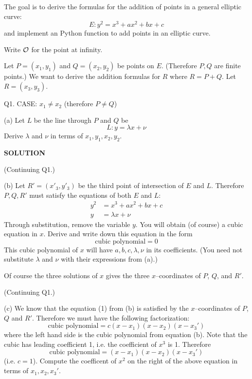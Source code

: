 \documentclass[a4paper,12pt]{article}
\begin{document}
\topmatter


The goal is to derive the formulas for the addition of points in 
a general elliptic curve:
\[
E: y^2 = x^3 + ax^2 + bx + c
\]
and implement an Python function to add points in an elliptic curve.

Write ${\cal O}$ for the point at infinity.

\newpage

Let $P = (x_1, y_1)$ and $Q = (x_2, y_2)$ be points on $E$.
(Therefore $P, Q$ are finite points.)
We want to derive the addition formulas for $R$ where $R = P + Q$.
Let $R = (x_3, y_3)$.

Q1. CASE: $x_1 \neq x_2$ (therefore $P \neq Q$)

(a) Let $L$ be the line through $P$ and $Q$ be
\[
L: y = \lambda x + \nu 
\] 
Derive $\lambda$ and $\nu$ in terms of $x_1, y_1, x_2, y_2$.

{\bf SOLUTION}




\newpage


(Continuing Q1.)

(b) Let $R' = (x'_3, y'_3)$ be the third point of intersection of $E$ and $L$.
Therefore $P, Q, R'$ must satisfy the equations of both $E$ and $L$:
\begin{align*}
y^2 &= x^3 + ax^2 + bx + c \\
y   &= \lambda x + \nu
\end{align*}
Through substitution, remove the variable $y$. 
You will obtain (of course) a cubic equation in $x$.
Derive and write down this equation in the form
\[
\text{cubic polynomial} = 0 
\]
This cubic polynomial of $x$ will have $a,b,c,\lambda, \nu$ 
in its coefficients.
(You need not substitute $\lambda$ and $\nu$ with their
expressions from (a).)

Of course the three solutions of $x$ gives the three $x$--coordinates
of $P$, $Q$, and $R'$.

\SOLUTION



\newpage

(Continuing Q1.)

(c) We know that the equation (1) from (b) is satisfied by 
the $x$--coordinates of $P$, $Q$ and $R'$.
Therefore we must have the following factorization:
\[
\text{cubic polynomial} = c(x - x_1) (x - x_2) (x - x_3')
\]
where the left hand side is the cubic polynomial from equation (b).
Note that the cubic has leading coefficient 1, i.e. the coefficient
of $x^3$ is 1. Therefore
\[
\text{cubic polynomial} = (x - x_1) (x - x_2) (x - x_3')
\]
(i.e. $c = 1$).
Compute the coefficent of $x^2$ on the right of the above equation
in terms of $x_1, x_2, x_3'$.
\end{document}
